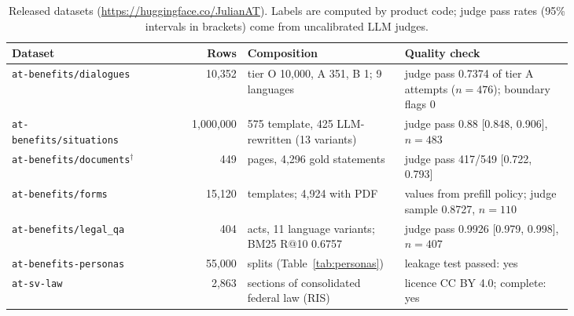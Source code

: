 \begin{table}[t]
\centering
\footnotesize
\caption{Released datasets (\url{https://huggingface.co/JulianAT}). Labels are computed by product code; judge pass rates (95\% intervals in brackets) come from uncalibrated LLM judges.}
\label{tab:data}
\setlength{\tabcolsep}{4pt}
\begin{tabular}{>{\raggedright\arraybackslash}p{0.24\linewidth}r>{\raggedright\arraybackslash}p{0.29\linewidth}>{\raggedright\arraybackslash}p{0.30\linewidth}}
\toprule
Dataset & Rows & Composition & Quality check \\
\midrule
\texttt{at-benefits/dialogues} & 10{,}352 & tier O 10{,}000, A 351, B 1; 9 languages & judge pass 0.7374 of tier A attempts ($n=476$); boundary flags 0 \\
\texttt{at-benefits/situations} & 1{,}000{,}000 & 999{,}575 template, 425 LLM-rewritten (13 variants) & judge pass 0.88 [0.848, 0.906], $n=483$ \\
\texttt{at-benefits/documents}$^{\dagger}$ & 449 & 499 pages, 4{,}296 gold statements & judge pass 417/549 [0.722, 0.793] \\
\texttt{at-benefits/forms} & 15{,}120 & 27 templates; 4{,}924 with PDF & values from prefill policy; judge sample 0.8727, $n=110$ \\
\texttt{at-benefits/legal\_qa} & 404 & 8 acts, 11 language variants; BM25 R@10 0.6757 & judge pass 0.9926 [0.979, 0.998], $n=407$ \\
\texttt{at-benefits-personas} & 55{,}000 & 4 splits (Table~\ref{tab:personas}) & leakage test passed: yes \\
\texttt{at-sv-law} & 2{,}863 & sections of consolidated federal law (RIS) & licence CC BY 4.0; complete: yes \\
\bottomrule
\end{tabular}
\par{}
\end{table}
